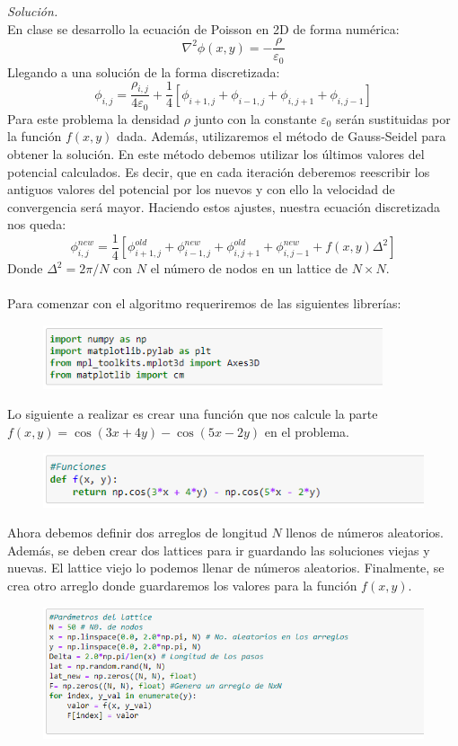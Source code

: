 \documentclass[11pt]{article}
\begin{document}
	\textit{Solución.}\\
	En clase se desarrollo la ecuación de Poisson en 2D de forma numérica:
	$$\nabla^2 \phi (x,y) = -\frac{\rho}{\varepsilon_0}$$
	Llegando a una solución de la forma discretizada:
	$$\phi_{i,j} = \frac{\rho_{i,j}}{4\varepsilon_0} + \frac{1}{4}\left[\phi_{i+1,j} + \phi_{i-1,j} + \phi_{i,j+1} + \phi_{i,j-1}\right]$$
	Para este problema la densidad $\rho$ junto con la constante $\varepsilon_0$ serán sustituidas por la función $f(x,y)$ dada. Además, utilizaremos el método de Gauss-Seidel para obtener la solución. En este método debemos utilizar los últimos valores del potencial calculados. Es decir, que en cada iteración deberemos reescribir los antiguos valores del potencial por los nuevos y con ello la velocidad de convergencia será mayor. Haciendo estos ajustes, nuestra ecuación discretizada nos queda:
	$$\phi_{i,j}^{new} = \frac{1}{4}\left[\phi_{i+1,j}^{old} + \phi_{i-1,j}^{new} + \phi_{i,j+1}^{old} + \phi_{i,j-1}^{new} + f(x,y) \Delta^2 \right]$$
	Donde $\Delta^2 = 2\pi/N$ con $N$ el número de nodos en un lattice de $N\times N$.\\\\
	Para comenzar con el algoritmo requeriremos de las siguientes librerías:
	\begin{figure}[h]
		\centering
		\includegraphics[width=10cm]{Img/1.1.PNG}
	\end{figure}
\newpage
	Lo siguiente a realizar es crear una función que nos calcule la parte $f(x,y) = \cos(3x + 4y) - \cos(5x - 2y)$ en el problema.
	 \begin{figure}[h]
	 	\centering
	 	\includegraphics[width=12cm]{Img/1.2.PNG}
	 \end{figure}
 
	Ahora debemos definir dos arreglos de longitud $N$ llenos de números aleatorios. Además, se deben crear dos lattices para ir guardando las soluciones viejas y nuevas. El lattice viejo lo podemos llenar de números aleatorios. Finalmente, se crea otro arreglo donde guardaremos los valores para la función $f(x,y)$.
	\begin{figure}[h!]
		\centering
		\includegraphics[width=13cm]{Img/1.3.PNG}
	\end{figure}
	
\end{document}
